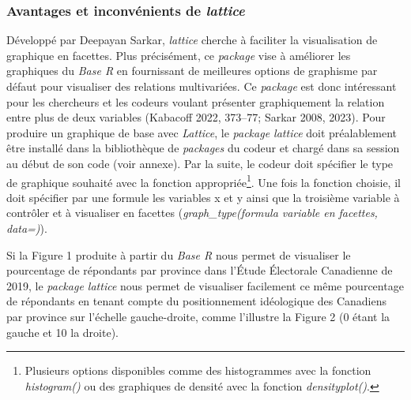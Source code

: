 \documentclass[
  letterpaper,
]{scrbook}
\begin{document}
\hypertarget{avantages-et-inconvuxe9nients-de-lattice}{%
\subsubsection{\texorpdfstring{Avantages et inconvénients de
\emph{lattice}}{Avantages et inconvénients de lattice}}\label{avantages-et-inconvuxe9nients-de-lattice}}

Développé par Deepayan Sarkar, \emph{lattice} cherche à faciliter la
visualisation de graphique en facettes. Plus précisément, ce
\emph{package} vise à améliorer les graphiques du \emph{Base R} en
fournissant de meilleures options de graphisme par défaut pour
visualiser des relations multivariées. Ce \emph{package} est donc
intéressant pour les chercheurs et les codeurs voulant présenter
graphiquement la relation entre plus de deux variables (Kabacoff 2022,
373--77; Sarkar 2008, 2023). Pour produire un graphique de base avec
\emph{Lattice}, le \emph{package lattice} doit préalablement être
installé dans la bibliothèque de \emph{packages} du codeur et chargé
dans sa session au début de son code (voir annexe). Par la suite, le
codeur doit spécifier le type de graphique souhaité avec la fonction
appropriée\footnote{Plusieurs options disponibles comme des histogrammes
  avec la fonction \emph{histogram()} ou des graphiques de densité avec
  la fonction \emph{densityplot()}.}. Une fois la fonction choisie, il
doit spécifier par une formule les variables x et y ainsi que la
troisième variable à contrôler et à visualiser en facettes
(\emph{graph\_type(formula \textbar{} variable en facettes, data=)}).

Si la Figure 1 produite à partir du \emph{Base R} nous permet de
visualiser le pourcentage de répondants par province dans l'Étude
Électorale Canadienne de 2019, le \emph{package lattice} nous permet de
visualiser facilement ce même pourcentage de répondants en tenant compte
du positionnement idéologique des Canadiens par province sur l'échelle
gauche-droite, comme l'illustre la Figure 2 (0 étant la gauche et 10 la
droite).
\end{document}
